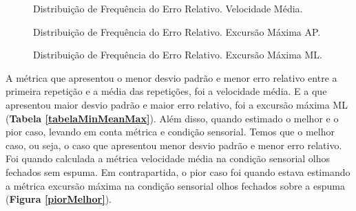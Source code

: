 \begin{figure}[ht]
\captionsetup{justification   = raggedright,
              singlelinecheck = false}
\caption{Distribuição de Frequência do Erro Relativo. Velocidade Média.}\label{DistVM}

\end{figure}

\begin{figure}[ht]
\captionsetup{justification   = raggedright,
              singlelinecheck = false}
\caption{Distribuição de Frequência do Erro Relativo. Excursão Máxima AP.}\label{DistAP}

\end{figure}

\begin{figure}[ht]
\captionsetup{justification   = raggedright,
              singlelinecheck = false}
\caption{Distribuição de Frequência do Erro Relativo. Excursão Máxima ML.}\label{DistML}

\end{figure}



A métrica que apresentou o menor desvio padrão e menor erro relativo entre a primeira repetição e a média das repetições, foi a velocidade média. E a que apresentou maior desvio padrão e maior erro relativo, foi a excursão máxima ML (\textbf{Tabela \ref{tabelaMinMeanMax}}). Além disso, quando estimado o melhor e o pior caso, levando em conta métrica e condição sensorial. Temos que o melhor caso, ou seja, o caso que apresentou menor desvio padrão e menor erro relativo. Foi quando calculada a métrica velocidade média na condição sensorial olhos fechados sem espuma. Em  contrapartida, o pior caso foi quando estava estimando a métrica excursão máxima na condição sensorial olhos fechados sobre a espuma (\textbf{Figura \ref{piorMelhor}}).

\newline


